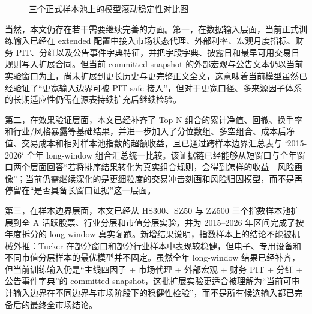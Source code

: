 \begin{figure}[htbp]
\centering
{}
\caption{三个正式样本池上的模型滚动稳定性对比图}
\label{fig:stability}
\end{figure}

当然，本文仍存在若干需要继续完善的方面。第一，在数据输入层面，当前正式训练输入已经在 extended 配置中接入市场状态代理、外部利率、宏观月度指标、财务 PIT、分红以及公告事件字典特征，并把字段字典、披露日和最早可用交易日规则写入扩展合同。但当前 committed snapshot 的外部宏观与公告文本仍以当前实验窗口为主，尚未扩展到更长历史与更完整正文全文，这意味着当前模型虽然已经验证了“更宽输入边界可被 PIT-safe 接入”，但对于更宽口径、多来源因子体系的长期适应性仍需在源表持续扩充后继续检验。

第二，在效果验证层面，本文已经补齐了 Top-N 组合的累计净值、回撤、换手率和行业/风格暴露等基础结果，并进一步加入了分位数组、多空组合、成本后净值、交易成本和相对样本池指数的超额收益，且已通过跨样本边界汇总表与 `2015-2026` 全年 long-window 组合汇总统一比较。该证据链已经能够从短窗口与全年窗口两个层面回答“若将排序结果转化为真实组合规则，会得到怎样的收益—风险画像”；当前仍需继续深化的是更细粒度的交易冲击刻画和风险归因模型，而不是再停留在“是否具备长窗口证据”这一层面。

第三，在样本边界层面，本文已经从 HS300、SZ50 与 ZZ500 三个指数样本池扩展到全 A 活跃股票、行业分层和市值分层实验，并为 2015--2026 年区间完成了按年度拆分的 long-window 真实复跑。新增结果说明，指数样本上的结论不能被机械外推：Tucker 在部分窗口和部分行业样本中表现较稳健，但电子、专用设备和不同市值分层样本的最优模型并不固定。虽然全年 long-window 结果已经补齐，但当前训练输入仍是“主线四因子 + 市场代理 + 外部宏观 + 财务 PIT + 分红 + 公告事件字典”的 committed snapshot，这批扩展实验更适合被理解为“当前可审计输入边界在不同边界与市场阶段下的稳健性检验”，而不是所有候选输入都已完备后的最终全市场结论。

